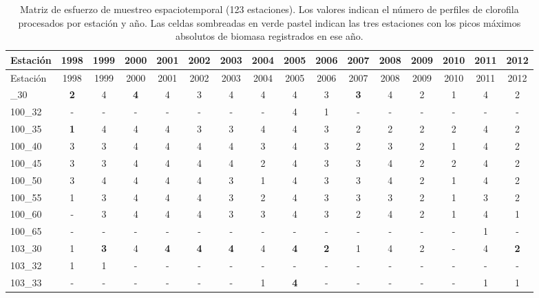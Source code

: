 {\scriptsize
\setlength{\tabcolsep}{3pt}
\begin{longtable}{lccccccccccccccc}
\caption{Matriz de esfuerzo de muestreo espaciotemporal (123 estaciones). Los valores indican el número de perfiles de clorofila procesados por estación y año. Las celdas sombreadas en verde pastel indican las tres estaciones con los picos máximos absolutos de biomasa registrados en ese año.} \label{tab:esfuerzo} \\
\toprule
Estación & 1998 & 1999 & 2000 & 2001 & 2002 & 2003 & 2004 & 2005 & 2006 & 2007 & 2008 & 2009 & 2010 & 2011 & 2012 \\
\midrule
\endfirsthead
\toprule
Estación & 1998 & 1999 & 2000 & 2001 & 2002 & 2003 & 2004 & 2005 & 2006 & 2007 & 2008 & 2009 & 2010 & 2011 & 2012 \\
\midrule
\endhead
\bottomrule
\endfoot
\bottomrule
\endlastfoot
100\_30 & \cellcolor{green!20}\textbf{2} & 4 & \cellcolor{green!20}\textbf{4} & 4 & 3 & 4 & 4 & 4 & 3 & \cellcolor{green!20}\textbf{3} & 4 & 2 & 1 & 4 & 2 \\
100\_32 & - & - & - & - & - & - & - & 4 & 1 & - & - & - & - & - & - \\
100\_35 & \cellcolor{green!20}\textbf{1} & 4 & 4 & 4 & 3 & 3 & 4 & 4 & 3 & 2 & 2 & 2 & 2 & 4 & 2 \\
100\_40 & 3 & 3 & 4 & 4 & 4 & 4 & 3 & 4 & 3 & 2 & 3 & 2 & 1 & 4 & 2 \\
100\_45 & 3 & 3 & 4 & 4 & 4 & 4 & 2 & 4 & 3 & 3 & 4 & 2 & 2 & 4 & 2 \\
100\_50 & 3 & 4 & 4 & 4 & 4 & 3 & 1 & 4 & 3 & 3 & 4 & 2 & 1 & 4 & 2 \\
100\_55 & 1 & 3 & 4 & 4 & 4 & 3 & 2 & 4 & 3 & 3 & 3 & 2 & 1 & 3 & 2 \\
100\_60 & - & 3 & 4 & 4 & 4 & 3 & 3 & 4 & 3 & 2 & 4 & 2 & 1 & 4 & 1 \\
100\_65 & - & - & - & - & - & - & - & - & - & - & - & - & - & 1 & - \\
103\_30 & 1 & \cellcolor{green!20}\textbf{3} & 4 & \cellcolor{green!20}\textbf{4} & \cellcolor{green!20}\textbf{4} & \cellcolor{green!20}\textbf{4} & 4 & \cellcolor{green!20}\textbf{4} & \cellcolor{green!20}\textbf{2} & 1 & 4 & 2 & - & 4 & \cellcolor{green!20}\textbf{2} \\
103\_32 & 1 & 1 & - & - & - & - & - & - & - & - & - & - & - & - & - \\
103\_33 & - & - & - & - & - & - & 1 & \cellcolor{green!20}\textbf{4} & - & - & - & - & - & 1 & 1 \\

\end{longtable}}
